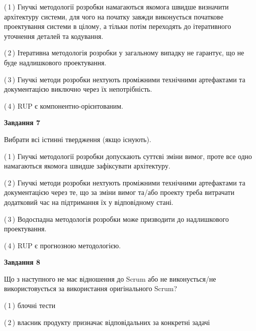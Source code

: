 \documentclass[10pt, ukrainian]{article}
\begin{document}
{\begin {large}
(\,1\,) Гнучкі методології розробки намагаються якомога швидше визначити архітектуру системи, для чого на початку завжди виконується початкове проектування системи в цілому, а тільки потім переходять до ітеративного уточнення деталей та кодування. %



(\,2\,) Ітеративна методологія розробки у загальному випадку не гарантує, що не буде надлишкового проектування. %



(\,3\,) Гнучкі методи розробки нехтують проміжними технічними артефактами та документацією виключно через їх непотрібність. %



(\,4\,) RUP є компонентно-орієнтованим. %


{\begin {center}\textbf{Завдання 7}\end {center}}\par
Вибрати всі істинні твердження (якщо існують).\par
\vspace{2mm}



(\,1\,) Гнучкі методології розробки допускають суттєві зміни вимог, проте все одно намагаються якомога швидше зафіксувати архітектуру. %



(\,2\,) Гнучкі методи розробки нехтують проміжними технічними артефактами та документацією через те, що за зміни вимог та/або проекту треба витрачати додатковий час на підтримання їх у відповідному стані. %



(\,3\,) Водоспадна методологія розробки може призводити до надлишкового проектування. %



(\,4\,) RUP є прогнозною методологією. %


{\begin {center}\textbf{Завдання 8}\end {center}}\par
Що з наступного не має відношення до Scrum або не виконується/не використовується за використання оригінального Scrum?\par
\vspace{2mm}



(\,1\,) блочні тести%



(\,2\,) власник продукту призначає відповідальних за конкретні задачі%




\end{large}}
\end{document}

